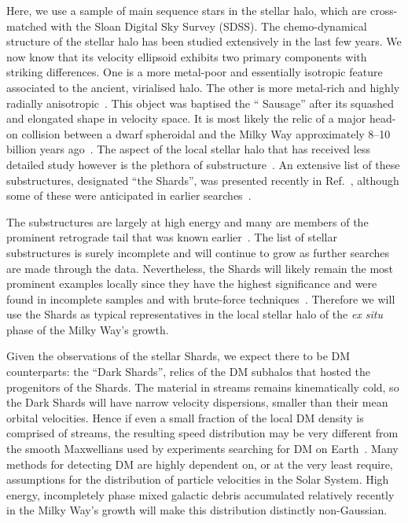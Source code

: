 \documentclass[prd,10pt,twocolumn,showpacs,nofootinbib,aps,superscriptaddress,preprintnumbers]{revtex4-1}
\newcommand{\Gaia}{\!{\it Gaia}\xspace}
\begin{document}
 Here, we use a sample of \Gaia main sequence stars in the stellar
 halo, which are cross-matched with the Sloan Digital Sky Survey
 (SDSS). The chemo-dynamical
 structure of the stellar halo has been studied extensively in the last
 few years. We now know that its velocity ellipsoid exhibits two
 primary components with striking differences. One is a more metal-poor
 and essentially isotropic feature associated to the ancient, virialised
 halo. The other is more metal-rich and highly radially
 anisotropic~\cite{Ca07,My18,Be18,Ma18,Koppelman:2018}. This object was
 baptised the ``\Gaia Sausage'' after its squashed and elongated shape
 in velocity space. It is most likely the relic of a major head-on
 collision between a dwarf spheroidal and the Milky Way approximately
 8--10 billion years ago~\cite{Be18,He18,Kr18,Fattahi:2018,Vincenzo:2019}. The aspect
 of the local stellar halo that has received less detailed study however is the plethora
 of substructure~\cite{Myeong:Preprint,Myeong:2017,Myeong:2017skt,SchlaufmanECHOS1,SchlaufmanECHOS2,SchlaufmanECHOS3}. An
 extensive list of these substructures, designated ``the Shards'', 
 was presented recently in Ref.~\cite{Myeong:Preprint}, although some
 of these were anticipated in earlier searches~\cite{Smith:2009,Helmi:2017,Myeong:2017,Myeong:2017skt}. 

 The substructures are
 largely at high energy and many are members of the prominent
 retrograde tail that was known earlier~\cite{Ma12}.  The list of
 stellar substructures is surely incomplete and will continue to grow
 as further searches are made through the \Gaia data. Nevertheless, the Shards will likely 
 remain the most prominent examples locally since they have the highest significance 
 and were found in incomplete samples and with brute-force techniques~\cite{Myeong:2017,Myeong:2017skt}.
 Therefore we will use the
 Shards as typical representatives in the local stellar halo of the {\it
   ex situ} phase of the Milky Way's growth. 
   


 Given the observations of the stellar Shards, we expect there to be
 DM counterparts: the ``Dark Shards'', relics of the DM
 subhalos that hosted the progenitors of the Shards. The material in
 streams remains kinematically cold, so the Dark Shards will have
 narrow velocity dispersions, smaller than their mean orbital
 velocities. Hence if even a small fraction of the
 local DM density is comprised of streams, the resulting speed
 distribution may be very different from the smooth Maxwellians used by
 experiments searching for DM on Earth~\cite{Lewin:1995rx, Lee:2012pf,O'Hare:2014oxa,Savage:2006qr,OHare:2017yze,Kavanagh:2016xfi}.
 Many methods for detecting DM are highly dependent on, or at the very
 least require, assumptions for the distribution of particle
 velocities in the Solar System.  High energy, incompletely phase mixed
 galactic debris accumulated relatively recently in the Milky Way's
 growth will make this distribution distinctly non-Gaussian.
\end{document}
